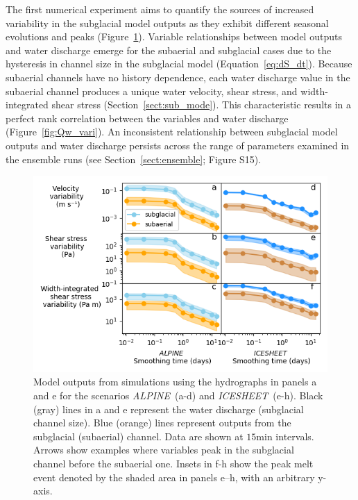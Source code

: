 \documentclass[tc, manuscript]{copernicus}
\newcommand{\alpine}{\textit{ALPINE}\,}
\newcommand{\icesheet}{\textit{ICESHEET}\,}
\begin{document}
The first numerical experiment aims to quantify the sources of increased variability in the subglacial model outputs as they exhibit different seasonal evolutions and peaks (Figure~\ref{fig:model_outs}).
Variable relationships between model outputs and water discharge emerge for the subaerial and subglacial cases due to the hysteresis in channel size in the subglacial model (Equation~\ref{eq:dS_dt}).
Because subaerial channels have no history dependence, each water discharge value in the subaerial channel produces a unique water velocity, shear stress, and width-integrated shear stress (Section~\ref{sect:sub_mode}).
This characteristic results in a perfect rank correlation between the variables and water discharge (Figure~\ref{fig:Qw_vari}).
An inconsistent relationship between subglacial model outputs and water discharge persists across the range of parameters examined in the ensemble runs (see Section~\ref{sect:ensemble}; Figure S15).
\begin{figure}[hbt!]
  \centering
  \includegraphics[width=\linewidth]{Fig5.png}
  \caption{Model outputs from simulations using the hydrographs in panels a and e for the scenarios \alpine{} (a-d) and \icesheet{} (e-h).
    Black (gray) lines in a and e represent the water discharge (subglacial channel size).
    Blue (orange) lines represent outputs from the subglacial (subaerial) channel.
    Data are shown at $15$\unit{min} intervals.
    Arrows show examples where variables peak in the subglacial channel before the subaerial one.
    Insets in f-h show the peak melt event denoted by the shaded area in panels e--h, with an arbitrary y-axis.
  }
  \label{fig:model_outs}
\end{figure}
\end{document}
